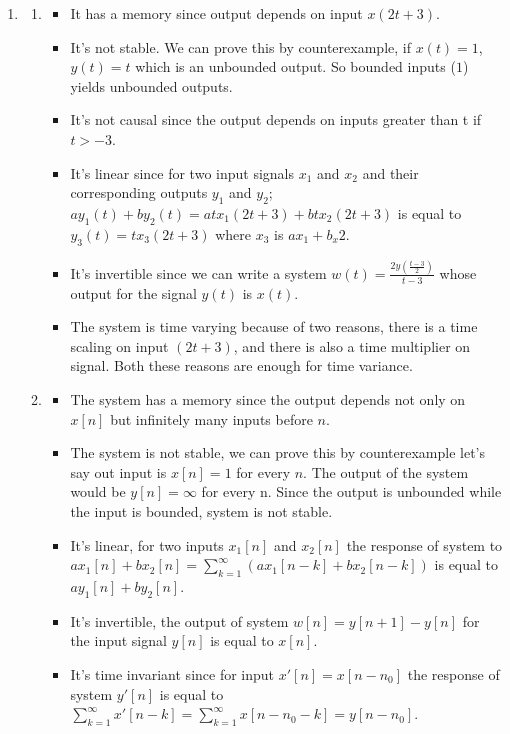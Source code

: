 \documentclass[10pt,a4paper, margin=1in]{article}
\begin{document}
\begin{enumerate}
    \item %
          \begin{enumerate}
              \item
                    \begin{itemize}
                        \item It has a memory since output depends on input $x(2t+3)$.
                        \item It's not stable. We can prove this by counterexample, if $x(t) = 1$, $y(t) = t$ which is an unbounded output. So bounded inputs ($1$) yields unbounded outputs.
                        \item It's not causal since the output depends on inputs greater than t if $t>-3$.
                        \item It's linear since for two input signals $x_1$ and $x_2$ and their corresponding outputs $y_1$ and $y_2$; $ay_1(t)+ by_2(t) = atx_1(2t+3) + btx_2(2t+3)$ is equal to $y_3(t) = tx_3(2t+3)$ where $x_3$ is $ax_1+b_x2$.
                        \item It's invertible since we can write a system $w(t) = \frac{2y(\frac{t-3}{2})}{t-3}$ whose output for the signal $y(t)$ is $x(t)$.
                        \item The system is time varying because of two reasons, there is a time scaling on input $(2t+3)$, and there is also a time multiplier on signal. Both these reasons are enough for time variance.
                    \end{itemize}
              \item
                    \begin{itemize}
                        \item The system has a memory since the output depends not only on $x[n]$ but infinitely many inputs before $n$.
                        \item The system is not stable, we can prove this by counterexample let's say out input is $x[n] = 1$ for every $n$. The output of the system would be $y[n] = \infty$ for every n. Since the output is unbounded while the input is bounded, system is not stable.
                        \item It's linear, for two inputs $x_1[n]$ and $x_2[n]$ the response of system to $ax_1[n] + bx_2[n] = \sum\limits_{k=1}^\infty (ax_1[n-k] + bx_2[n-k])$ is equal to $ay_1[n] + by_2[n]$.
                        \item It's invertible, the output of system $w[n] = y[n+1] - y[n]$ for the input signal $y[n]$ is equal to $x[n]$.
                        \item It's time invariant since for input $x'[n] = x[n-n_0]$ the response of system $y'[n]$ is equal to $\sum\limits_{k=1}^\infty x'[n-k] = \sum\limits_{k=1}^\infty x[n-n_0-k] = y[n-n_0]$.
                    \end{itemize}
          \end{enumerate}


\end{enumerate}
\end{document}
